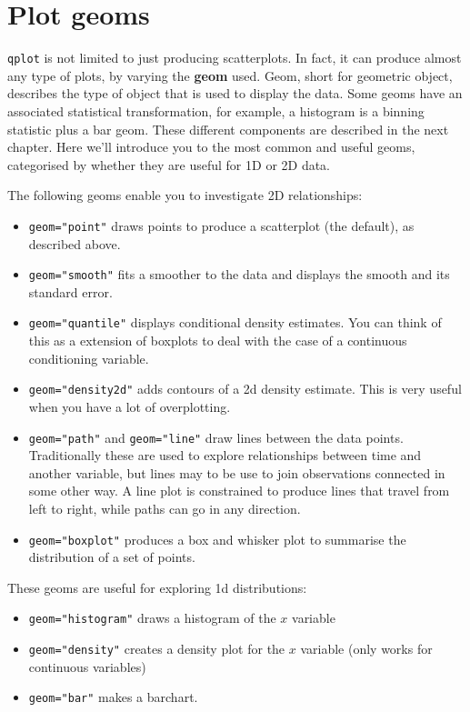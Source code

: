 \section{Plot geoms}\label{sec:plot_geoms}

{\tt qplot} is not limited to just producing scatterplots.  In fact, it can produce almost any type of plots, by varying the {\bf geom} used. Geom, short for geometric object, describes the type of object that is used to display the data.  Some geoms have an associated statistical transformation, for example, a histogram is a binning statistic plus a bar geom.  These different components are described in the next chapter.  Here we'll introduce you to the most common and useful geoms, categorised by whether they are useful for 1D or 2D data.

The following geoms enable you to investigate 2D relationships:

\begin{itemize}
	\item {\tt geom="point"} draws points to produce a scatterplot (the default), as described above.
	\item {\tt geom="smooth"} fits a smoother to the data and displays the smooth and its standard error.
	\item {\tt geom="quantile"} displays conditional density estimates.  You can think of this as a extension of boxplots to deal with the case of a continuous conditioning variable.
	\item {\tt geom="density2d"} adds contours of a 2d density estimate.  This is very useful when you have a lot of overplotting.
	\item {\tt geom="path"} and {\tt geom="line"} draw lines between the data points.  Traditionally these are used to explore relationships between time and another variable, but lines may to be use to join observations connected in some other way.  A line plot is constrained to produce lines that travel from left to right, while paths can go in any direction.
	\item {\tt geom="boxplot"} produces a box and whisker plot to summarise the distribution of a set of points.
\end{itemize}

These geoms are useful for exploring 1d distributions:

\begin{itemize}
	\item {\tt geom="histogram"} draws a histogram of the $x$ variable 
	\item {\tt geom="density"} creates a density plot for the $x$ variable (only works for continuous variables)
  \item {\tt geom="bar"} makes a barchart.
\end{itemize}

